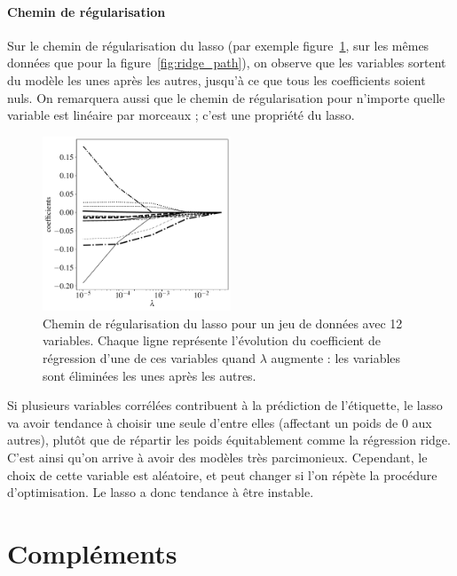 \paragraph{Chemin de régularisation}
Sur le chemin de régularisation du lasso (par exemple
figure~\ref{fig:lasso_path}, sur les mêmes données que pour la
figure~\ref{fig:ridge_path}), on observe que les variables sortent du modèle
les unes après les autres, jusqu'à ce que tous les coefficients soient nuls. On
remarquera aussi que le chemin de régularisation pour n'importe quelle variable
est linéaire par morceaux ; c'est une propriété du lasso.
\begin{figure}[h]
  \centering
  \includegraphics[width=0.5\textwidth]{figures/generalisation/lasso_path}
  \caption{Chemin de régularisation du lasso pour un jeu de données avec 12
    variables. Chaque ligne représente l'évolution du coefficient de régression
    d'une de ces variables quand $\lambda$ augmente : les variables sont
    éliminées les unes après les autres.}
  \label{fig:lasso_path}
\end{figure}

Si plusieurs variables corrélées contribuent à la prédiction de l'étiquette, le
lasso va avoir tendance à choisir une seule d'entre elles (affectant un poids
de 0 aux autres), plutôt que de répartir les poids équitablement comme la
régression ridge. C'est ainsi qu'on arrive à avoir des modèles très
parcimonieux. Cependant, le choix de cette variable est aléatoire, et peut
changer si l'on répète la procédure d'optimisation. Le lasso a donc tendance à
être instable.


\section{Compléments}
